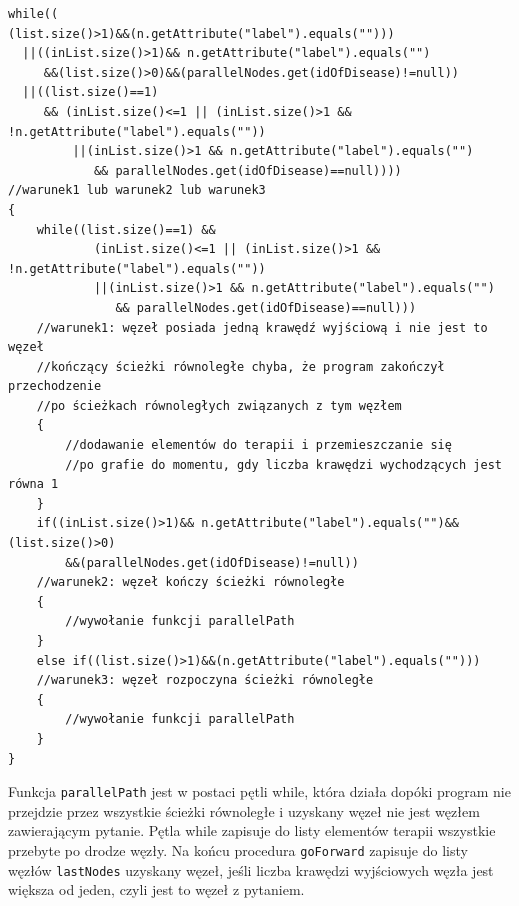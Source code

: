 
\newpage
\begin{verbatim}
while((
(list.size()>1)&&(n.getAttribute("label").equals("")))
  ||((inList.size()>1)&& n.getAttribute("label").equals("")
     &&(list.size()>0)&&(parallelNodes.get(idOfDisease)!=null))
  ||((list.size()==1) 
     && (inList.size()<=1 || (inList.size()>1 && !n.getAttribute("label").equals(""))
 	     ||(inList.size()>1 && n.getAttribute("label").equals("")
	        && parallelNodes.get(idOfDisease)==null))))
//warunek1 lub warunek2 lub warunek3
{
    while((list.size()==1) && 
    		(inList.size()<=1 || (inList.size()>1 && !n.getAttribute("label").equals(""))
    		||(inList.size()>1 && n.getAttribute("label").equals("") 
    		   && parallelNodes.get(idOfDisease)==null)))
    //warunek1: węzeł posiada jedną krawędź wyjściową i nie jest to węzeł 
    //kończący ścieżki równoległe chyba, że program zakończył przechodzenie 
    //po ścieżkach równoległych związanych z tym węzłem
    {
    	//dodawanie elementów do terapii i przemieszczanie się 
    	//po grafie do momentu, gdy liczba krawędzi wychodzących jest równa 1
    }
    if((inList.size()>1)&& n.getAttribute("label").equals("")&&(list.size()>0)
        &&(parallelNodes.get(idOfDisease)!=null))
    //warunek2: węzeł kończy ścieżki równoległe
    {
        //wywołanie funkcji parallelPath
    }
    else if((list.size()>1)&&(n.getAttribute("label").equals("")))
    //warunek3: węzeł rozpoczyna ścieżki równoległe
    {
        //wywołanie funkcji parallelPath
    }
}
\end{verbatim}
Funkcja \texttt{parallelPath} jest w postaci pętli while, która działa dopóki program nie przejdzie przez wszystkie ścieżki równoległe i uzyskany węzeł nie jest węzłem zawierającym pytanie. Pętla while zapisuje do listy elementów terapii wszystkie przebyte po drodze węzły. Na końcu procedura \texttt{goForward} zapisuje do listy węzłów \texttt{lastNodes} uzyskany węzeł, 
jeśli liczba krawędzi wyjściowych węzła jest większa od jeden, czyli jest to węzeł z pytaniem.

